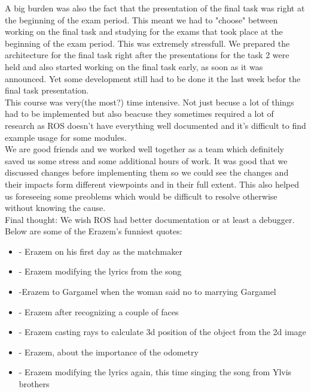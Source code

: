 \documentclass[12pt,a4paper]{article}
\begin{document}
	A big burden was also the fact that the presentation of the final task was right at the beginning of the exam period. This meant we had to "choose" between working on the final task and studying for the exams that took place at the beginning of the exam period. This was extremely stressfull. We prepared the architecture for the final task right after the presentations for the task 2 were held and also started working on the final task early, as soon as it was announced. Yet some development still had to be done it the last week befor the final task presentation. \\
	
	This course was very(the most?) time intensive. Not just becuse a lot of things had to be implemented but also beacuse they sometimes required a lot of research as ROS doesn't have everything well documented and it's difficult to find example usage for some modules. \\

	We are good friends and we worked well together as a team which definitely saved us some stress and some additional hours of work. It was good that we discussed changes before implementing them so we could see the changes and their impacts form different viewpoints and in their full extent. This also helped us foreseeing some preoblems which would be difficult to resolve otherwise without knowing the cause. \\

	Final thought: We wish ROS had better documentation or at least a debugger. \\


	Below are some of the Erazem's funniest quotes: 
	\begin{itemize}
		\item {} - Erazem on his first day as the matchmaker
		\item {} - Erazem modifying the lyrics from the song
		\item {} -Erazem to Gargamel when the woman said no to marrying Gargamel
		\item {} - Erazem after recognizing a couple of faces
		\item {} - Erazem casting rays to calculate 3d position of the object from the 2d image
		\item {} - Erazem, about the importance of the odometry
		\item {} - Erazem modifying the lyrics again, this time singing the song from Ylvis brothers 
	\end{itemize}
	
\end{document}

